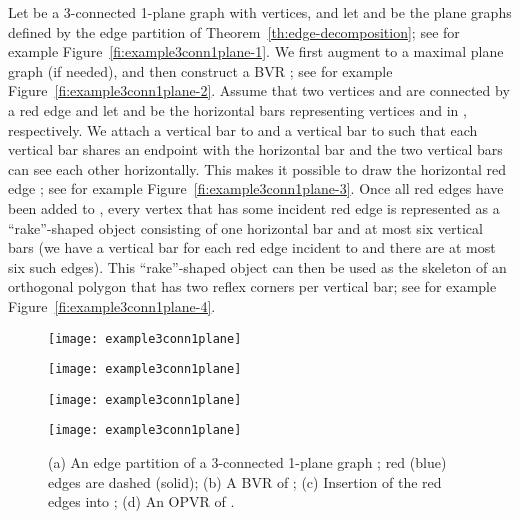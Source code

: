 \documentclass{article}
\newcommand{\opvr}{OPVR\xspace}
\begin{document}
Let  be a 3-connected 1-plane graph with  vertices, and let  and  be the plane graphs defined by the edge partition of Theorem~\ref{th:edge-decomposition}; see for example Figure~\ref{fi:example3conn1plane-1}. We first augment  to a maximal plane graph (if needed), and then construct a BVR ; see for example Figure~\ref{fi:example3conn1plane-2}. Assume that two vertices  and  are connected by a red edge and let  and  be the horizontal bars representing vertices  and  in , respectively. We attach a vertical bar to  and a vertical bar to  such that each vertical bar shares an endpoint with the horizontal bar and the two vertical bars can see each other horizontally. This makes it possible to draw the horizontal red edge ; see for example Figure~\ref{fi:example3conn1plane-3}.  Once all red edges have been added to , every vertex  that has some incident red edge is represented as a ``rake''-shaped object consisting of one horizontal bar and at most six vertical bars (we have a vertical bar for each red edge incident to  and there are at most six such edges). This ``rake''-shaped object can then be used as the skeleton of an orthogonal polygon that has two reflex corners per vertical bar; see for example Figure~\ref{fi:example3conn1plane-4}.

\begin{figure}[tb]
    \centering
    \begin{minipage}[b]{.24\textwidth}
    	\centering
    	\texttt{[image: example3conn1plane]}
    	\subcaption{}\label{fi:example3conn1plane-1}
    \end{minipage}
    \begin{minipage}[b]{.24\textwidth}
    	\centering
    	\texttt{[image: example3conn1plane]}
    	\subcaption{}\label{fi:example3conn1plane-2}
    \end{minipage}
    \begin{minipage}[b]{.24\textwidth}
    	\centering
    	\texttt{[image: example3conn1plane]}
    	\subcaption{}\label{fi:example3conn1plane-3}
    \end{minipage}
    \begin{minipage}[b]{.24\textwidth}
    	\centering
    	\texttt{[image: example3conn1plane]}
    	\subcaption{}\label{fi:example3conn1plane-4}
    \end{minipage}
    \caption{(a) An edge partition of a 3-connected 1-plane graph ; red (blue) edges are dashed (solid); (b) A BVR  of ; (c) Insertion of the red edges into ; (d) An \opvr of .\label{fi:example3conn1plane}}
\end{figure}
\end{document}

